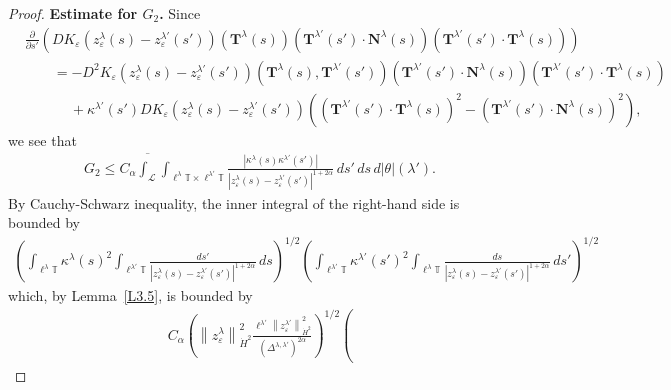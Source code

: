 \documentclass[reqno,centertags,12pt]{amsart}
\theoremstyle{definition}
\numberwithin{equation}{section}
\newcommand{\abs}[1]{\left\lvert#1\right\rvert}
\newcommand{\norm}[1]{\left\|#1\right\|}
\newcommand{\bbT}{{\mathbb{T}}}
\newcommand{\eps}{\varepsilon}
\begin{document}
\begin{proof}
    \textbf{Estimate for $G_{2}$.} Since
    \begin{align*}
        &\frac{\partial}{\partial s'}\left(
            DK_{\eps}(z_{\eps}^{\lambda}(s) - z_{\eps}^{\lambda'}(s'))(\mathbf{T}^{\lambda}(s))
            (\mathbf{T}^{\lambda'}(s') \cdot \mathbf{N}^{\lambda}(s))
            (\mathbf{T}^{\lambda'}(s') \cdot \mathbf{T}^{\lambda}(s))
        \right)
        \\&\quad\quad
        = -D^{2}K_{\eps}(z_{\eps}^{\lambda}(s) - z_{\eps}^{\lambda'}(s'))
        (\mathbf{T}^{\lambda}(s), \mathbf{T}^{\lambda'}(s'))
        (\mathbf{T}^{\lambda'}(s') \cdot \mathbf{N}^{\lambda}(s))
        (\mathbf{T}^{\lambda'}(s') \cdot \mathbf{T}^{\lambda}(s))
        \\&\quad\quad\quad\ 
        + \kappa^{\lambda'}(s')DK_{\eps}(z_{\eps}^{\lambda}(s) - z_{\eps}^{\lambda'}(s'))
        \left(
            (\mathbf{T}^{\lambda'}(s') \cdot \mathbf{T}^{\lambda}(s))^{2}
            - (\mathbf{T}^{\lambda'}(s') \cdot \mathbf{N}^{\lambda}(s))^{2}
        \right),
    \end{align*}
    we see that
    \begin{align*}
       G_{2} \leq C_{\alpha}\overline{\int_{\mathcal{L}}}
        \int_{\ell^{\lambda}\bbT\times\ell^{\lambda'}\bbT}
        \frac{\abs{\kappa^{\lambda}(s)\kappa^{\lambda'}(s')}}
        {\abs{z_{\eps}^{\lambda}(s) - z_{\eps}^{\lambda'}(s')}^{1+2\alpha}}
        \,ds'\,ds\,d|\theta|(\lambda').
    \end{align*}
    By Cauchy-Schwarz inequality, the inner integral
    of the right-hand side is bounded by
    \begin{align*}
        \left(
            \int_{\ell^{\lambda}\bbT}\kappa^{\lambda}(s)^{2}
            \int_{\ell^{\lambda'}\bbT}\frac{ds'}
            {\abs{z_{\eps}^{\lambda}(s) - z_{\eps}^{\lambda'}(s')}^{1+2\alpha}}
            \,ds
        \right)^{1/2}
        \left(
            \int_{\ell^{\lambda'}\bbT}\kappa^{\lambda'}(s')^{2}
            \int_{\ell^{\lambda}\bbT}\frac{ds}
            {\abs{z_{\eps}^{\lambda}(s) - z_{\eps}^{\lambda'}(s')}^{1+2\alpha}}
            \,ds'
        \right)^{1/2}
    \end{align*}
    which, by Lemma~\ref{L3.5}, is bounded by
    \begin{align*}
        C_{\alpha}\left(
            \norm{z_{\eps}^{\lambda}}_{\dot{H}^{2}}^{2}
            \frac{\ell^{\lambda'}\norm{z_{\eps}^{\lambda'}}_{\dot{H}^{2}}^{2}}
            {(\Delta^{\lambda,\lambda'})^{2\alpha}}
        \right)^{1/2}
        \left(

\end{align*}
\end{proof}
\end{document}
